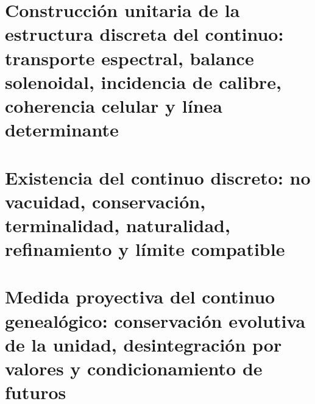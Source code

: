 \chapter{Construcción unitaria de la estructura discreta del continuo: transporte espectral, balance solenoidal, incidencia de calibre, coherencia celular y línea determinante}
\label{chap:sucesor-102-05}
\label{owner:sucesor-102-04b1-04b2-unicos}


\chapter{Existencia del continuo discreto: no vacuidad, conservación, terminalidad, naturalidad, refinamiento y límite compatible}
\label{chap:sucesor-102-06}
\label{owner:sucesor-102-04b3-unico}


\chapter{Medida proyectiva del continuo genealógico: conservación evolutiva de la unidad, desintegración por valores y condicionamiento de futuros}
\label{chap:sucesor-102-07}




